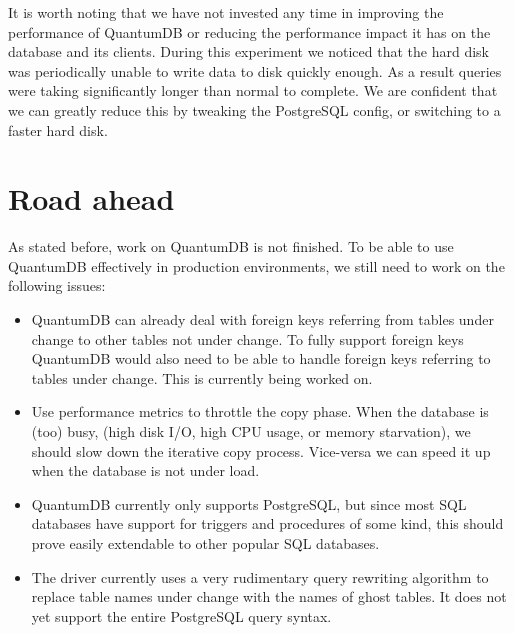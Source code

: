 \documentclass[conference]{IEEEtran}
\begin{document}
It is worth noting that we have not invested any time in improving the performance of QuantumDB or reducing the performance impact it has on the database and its clients. During this experiment we noticed that the hard disk was periodically unable to write data to disk quickly enough. As a result queries were taking significantly longer than normal to complete. We are confident that we can greatly reduce this by tweaking the PostgreSQL config, or switching to a faster hard disk.

\section{Road ahead}
As stated before, work on QuantumDB is not finished. To be able to use QuantumDB effectively in production environments, we still need to work on the following issues: 

\begin{itemize}
  \item{QuantumDB can already deal with foreign keys referring from tables under change to other tables not under change. To fully support foreign keys QuantumDB would also need to be able to handle foreign keys referring to tables under change. This is currently being worked on.}
  \item{Use performance metrics to throttle the copy phase. When the database is (too) busy, (high disk I/O, high CPU usage, or memory starvation), we should slow down the iterative copy process. Vice-versa we can speed it up when the database is not under load.}
  \item{QuantumDB currently only supports PostgreSQL, but since most SQL databases have support for triggers and procedures of some kind, this should prove easily extendable to other popular SQL databases.}
  \item{The driver currently uses a very rudimentary query rewriting algorithm to replace table names under change with the names of ghost tables. It does not yet support the entire PostgreSQL query syntax.}
\end{itemize}



%
%
\end{document}
